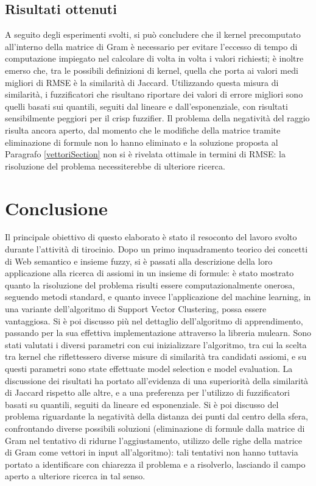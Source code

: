 \documentclass[12pt,a4paper]{report}
\begin{document}
\section{Risultati ottenuti}
A seguito degli esperimenti svolti, si può concludere che il kernel precomputato all'interno della matrice di Gram è necessario per evitare l'eccesso di tempo di computazione impiegato nel calcolare di volta in volta i valori richiesti; è inoltre emerso che, tra le possibili definizioni di kernel, quella che porta ai valori medi migliori di RMSE è la similarità di Jaccard. Utilizzando questa misura di similarità, i fuzzificatori che risultano riportare dei valori di errore migliori sono quelli basati sui quantili, seguiti dal lineare e dall'esponenziale, con risultati sensibilmente peggiori per il crisp fuzzifier.
Il problema della negatività del raggio risulta ancora aperto, dal momento che le modifiche della matrice tramite eliminazione di formule non lo hanno eliminato e la soluzione proposta al Paragrafo \ref{vettoriSection} non si è rivelata ottimale in termini di RMSE: la risoluzione del problema necessiterebbe di ulteriore ricerca.

\chapter*{Conclusione}

Il principale obiettivo di questo elaborato è stato il resoconto del lavoro svolto durante l'attività di tirocinio. Dopo un primo inquadramento teorico dei concetti di Web semantico e insieme fuzzy, si è passati alla descrizione della loro applicazione alla ricerca di assiomi in un insieme di formule: è stato mostrato quanto la risoluzione del problema risulti essere computazionalmente onerosa, seguendo metodi standard, e quanto invece l'applicazione del machine learning, in una variante dell'algoritmo di Support Vector Clustering, possa essere vantaggiosa.
Si è poi discusso più nel dettaglio dell'algoritmo di apprendimento, passando per la sua effettiva implementazione attraverso la libreria mulearn.
Sono stati valutati i diversi parametri con cui inizializzare l'algoritmo, tra cui la scelta tra kernel che riflettessero diverse misure di similarità tra candidati assiomi, e su questi parametri sono state effettuate model selection e model evaluation. La discussione dei risultati ha portato all'evidenza di una superiorità della similarità di Jaccard rispetto alle altre, e a una preferenza per l'utilizzo di fuzzificatori basati su quantili, seguiti da lineare ed esponenziale.
Si è poi discusso del problema riguardante la negatività della distanza dei punti dal centro della sfera, confrontando diverse possibili soluzioni (eliminazione di formule dalla matrice di Gram nel tentativo di ridurne l'aggiustamento, utilizzo delle righe della matrice di Gram come vettori in input all'algoritmo): tali tentativi non hanno tuttavia portato a identificare con chiarezza il problema e a risolverlo, lasciando il campo aperto a ulteriore ricerca in tal senso.



\end{document}
